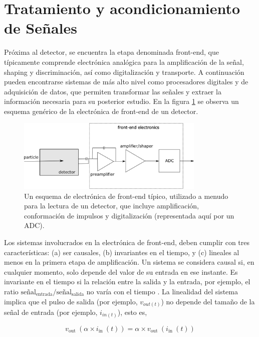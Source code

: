 \documentclass[]{book}
\begin{document}
\section{Tratamiento y acondicionamiento de Señales}

\noindent Próxima al detector, se encuentra la etapa denominada front-end, que típicamente comprende electrónica analógica para la amplificación de la señal, shaping y discriminación, así como digitalización y transporte. A continuación pueden encontrarse sistemas de más alto nivel como procesadores digitales y de adquisición de datos, que permiten transformar las señales y extraer la información necesaria para su posterior estudio. En la figura \ref{fig:generic_frontend} se observa un esquema genérico de la electrónica de front-end de un detector.\\

\begin{figure}[h]
    \centering
    \includegraphics[width=0.8\textwidth]{front-end.png}
    \caption{Un esquema de electrónica de front-end típico, utilizado a menudo para la lectura de un
    detector, que incluye amplificación, conformación de impulsos y digitalización (representada aquí por un ADC).}
    \label{fig:generic_frontend}

\end{figure}

\noindent Los sistemas involucrados en la electrónica de front-end, deben cumplir con tres características: (a) ser causales, (b) invariantes en el tiempo, y (c) lineales al menos en la primera etapa de amplificación. Un sistema se considera causal si, en cualquier momento, solo depende del valor de su entrada en ese instante. Es invariante en el tiempo si la relación entre la salida y la entrada, por ejemplo, el ratio $\text{señal}_{\text{entrada}}/\text{señal}_{\text{salida}}$ no varía con el tiempo \cite{kolanoski2020particle}. La linealidad del sistema implica que el pulso de salida (por ejemplo, $v_{out(t)}$) no depende del tamaño de la señal de entrada (por ejemplo, $i_{in(t)}$), esto es, 

$$
v_{\text {out }}\left(\alpha \times i_{\text {in }}(t)\right)=\alpha \times v_{\text {out }}\left(i_{\text {in }}(t)\right)
$$
\end{document}
